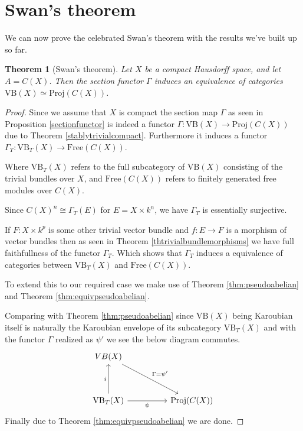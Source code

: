 \documentclass[12pt]{report}
\numberwithin{equation}{section}
\newtheorem{theorem}[dummy]{Theorem}
\begin{document}
	
	
	\section{Swan's theorem}
	
	We can now prove the celebrated Swan's theorem with the results we've built up so far.
	\begin{theorem}[Swan's theorem]\label{thm:serreswan}
		Let $X$ be a compact Hausdorff space, and let $A = C(X)$. Then the section functor $\Gamma$ induces an equivalence of categories $\mathrm{VB}(X) \simeq \mathrm{Proj}(C(X))$.
	\end{theorem}
	
	\begin{proof}
		Since we assume that $X$ is compact the section map $\Gamma$ as seen in Proposition \ref{sectionfunctor} is indeed a functor $\Gamma: \mathrm{VB}(X) \to \mathrm{Proj}(C(X))$ due to Theorem \ref{stablytrivialcompact}. Furthermore it induces a functor $\Gamma_T: \mathrm{VB}_{T}(X) \to \mathrm{Free}(C(X))$.
		
		Where $\mathrm{VB}_T(X)$ refers to the full subcategory of $\mathrm{VB}(X)$ consisting of the trivial bundles over $X$, and $\mathrm{Free}(C(X))$ refers to finitely generated free modules over $C(X)$.
		
		Since $C(X)^n \cong \Gamma_T(E)$ for $E=X\times k^n$, we have $\Gamma_T$ is essentially surjective.
		
		If $F:X \times k^p$ is some other trivial vector bundle and $f:E \to F$ is a morphism of vector bundles then as seen in Theorem \ref{thtrivialbundlemorphisms} we have full faithfullness of the functor $\Gamma_T$. Which shows that $\Gamma_T$ induces a equivalence of categories between $\mathrm{VB}_T(X) $ and $\mathrm{Free}(C(X))$.
		
		To extend this to our required case we make use of Theorem \ref{thm:pseudoabelian} and Theorem \ref{thm:equivpseudoabelian}.
		
		Comparing with Theorem \ref{thm:pseudoabelian} since $\mathrm{VB}(X)$ being Karoubian itself is naturally the Karoubian envelope of its subcategory $\mathrm{VB}_T(X)$ and with the functor $\Gamma$ realized as $\psi'$ we see the below diagram commutes.
		\[\begin{tikzcd}
			{VB(X)} \\
			\\
			{\mathrm{VB}_T(X)} && {\mathrm{Proj}(C(X))}
			\arrow["{\Gamma =\psi'}", from=1-1, to=3-3]
			\arrow["i", from=3-1, to=1-1]
			\arrow["\psi"', from=3-1, to=3-3]
		\end{tikzcd}\]
		Finally due to Theorem \ref{thm:equivpseudoabelian} we are done.
	\end{proof}
	
\end{document}
